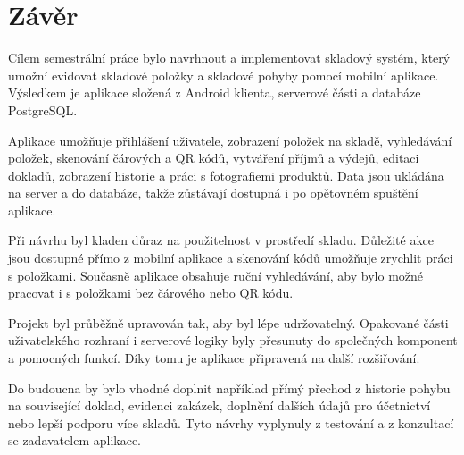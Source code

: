 \documentclass[czech, oth, kiv, he, pdf, viewonly]{fasthesis}
\begin{document}



\chapter{Závěr}

Cílem semestrální práce bylo navrhnout a implementovat skladový systém,
který umožní evidovat skladové položky a skladové pohyby pomocí mobilní
aplikace. Výsledkem je aplikace složená z Android klienta, serverové
části a databáze PostgreSQL.

Aplikace umožňuje přihlášení uživatele, zobrazení položek na skladě,
vyhledávání položek, skenování čárových a QR kódů, vytváření příjmů
a výdejů, editaci dokladů, zobrazení historie a práci s fotografiemi
produktů. Data jsou ukládána na server a do databáze, takže zůstávají
dostupná i po opětovném spuštění aplikace.

Při návrhu byl kladen důraz na použitelnost v prostředí skladu.
Důležité akce jsou dostupné přímo z mobilní aplikace a skenování kódů
umožňuje zrychlit práci s položkami. Současně aplikace obsahuje ruční
vyhledávání, aby bylo možné pracovat i s položkami bez čárového nebo
QR kódu.

Projekt byl průběžně upravován tak, aby byl lépe udržovatelný.
Opakované části uživatelského rozhraní i serverové logiky byly
přesunuty do společných komponent a pomocných funkcí. Díky tomu je
aplikace připravená na další rozšiřování.

Do budoucna by bylo vhodné doplnit například přímý přechod z historie
pohybu na související doklad, evidenci zakázek, doplnění dalších údajů
pro účetnictví nebo lepší podporu více skladů. Tyto návrhy vyplynuly
z testování a z konzultací se zadavatelem aplikace.
\end{document}
